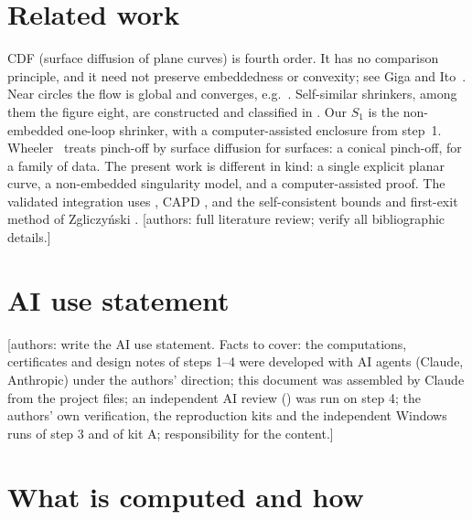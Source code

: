 \documentclass[11pt]{article}
\theoremstyle{definition}
\theoremstyle{remark}
\newcommand{\fn}[1]{\texttt{\detokenize{#1}}}
\newcommand{\AUTH}[1]{\textcolor{blue!55!black}{\textsf{\small[authors: #1]}}}
\begin{document}
\section{Related work}\label{s:rel}
CDF (surface diffusion of plane curves) is fourth order. It has no comparison principle, and it need not preserve embeddedness or convexity; see Giga and Ito~\cite{GI}. Near circles the flow is global and converges, e.g.\ \cite{Wh13}. Self-similar shrinkers, among them the figure eight, are constructed and classified in \cite{EGMWW}. Our $S_1$ is the non-embedded one-loop shrinker, with a computer-assisted enclosure from step~1. Wheeler~\cite{Wh26} treats pinch-off by surface diffusion for surfaces: a conical pinch-off, for a family of data. The present work is different in kind: a single explicit planar curve, a non-embedded singularity model, and a computer-assisted proof. The validated integration uses \fn{arb} \cite{Arb}, CAPD \cite{CAPD}, and the self-consistent bounds and first-exit method of Zgliczy\'nski \cite{Zg}. \AUTH{full literature review; verify all bibliographic details.}

\section{AI use statement}\label{s:ai}
\AUTH{write the AI use statement. Facts to cover: the computations, certificates and design notes of steps 1--4 were developed with AI agents (Claude, Anthropic) under the authors' direction; this document was assembled by Claude from the project files; an independent AI review (\fn{STEP4_REVIEW.md}) was run on step 4; the authors' own verification, the reproduction kits and the independent Windows runs of step 3 and of kit A; responsibility for the content.}

\appendix
\section{What is computed and how}\label{app:how}
\end{document}
